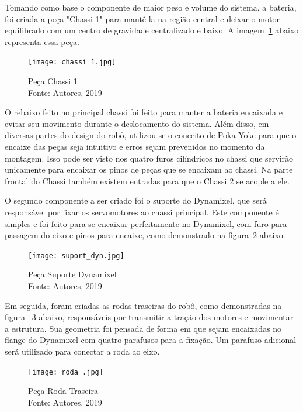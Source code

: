 Tomando como base o componente de maior peso e volume do sistema, a bateria, foi criada a peça "Chassi 1" para mantê-la na região central e deixar o motor equilibrado com um centro de gravidade centralizado e baixo. A imagem~\ref{fig:chassi_1} abaixo representa essa peça.

\begin{figure}[h!]
	\centering
	\texttt{[image: chassi\_1.jpg]}\\
	\caption{Peça Chassi 1 \\ Fonte: Autores, 2019}
	\label{fig:chassi_1}
\end{figure}

O rebaixo feito no principal chassi foi feito para manter a bateria encaixada e evitar seu movimento durante o deslocamento do sistema. Além disso, em diversas partes do design do robô, utilizou-se o conceito de Poka Yoke para que o encaixe das peças seja intuitivo e erros sejam prevenidos no momento da montagem. Isso pode ser visto nos quatro furos cilíndricos no chassi que servirão unicamente para encaixar os pinos de peças que se encaixam ao chassi. Na parte frontal do Chassi também existem entradas para que o Chassi 2 se acople a ele.

O segundo componente a ser criado foi o suporte do Dynamixel, que será responsável por fixar os servomotores ao chassi principal. Este componente é simples e foi feito para se encaixar perfeitamente no Dynamixel, com furo para passagem do eixo e pinos
para encaixe, como demonstrado na figura~\ref{fig:suport_dyn} abaixo.

\begin{figure}[h!]
	\centering
	\texttt{[image: suport\_dyn.jpg]}\\
	\caption{Peça Suporte Dynamixel \\ Fonte: Autores, 2019}
	\label{fig:suport_dyn}
\end{figure}

Em seguida, foram criadas as rodas traseiras do robô, como demonstradas na figura ~\ref{fig:roda_} abaixo, responsáveis por transmitir a tração dos motores e movimentar a estrutura. Sua geometria foi pensada de forma em que sejam encaixadas no flange do Dynamixel com quatro parafusos para a fixação. Um parafuso adicional será utilizado para conectar a roda ao eixo.

\begin{figure}[h!]
	\centering
	\texttt{[image: roda\_.jpg]}\\
	\caption{Peça Roda Traseira \\ Fonte: Autores, 2019}
	\label{fig:roda_}
\end{figure}

